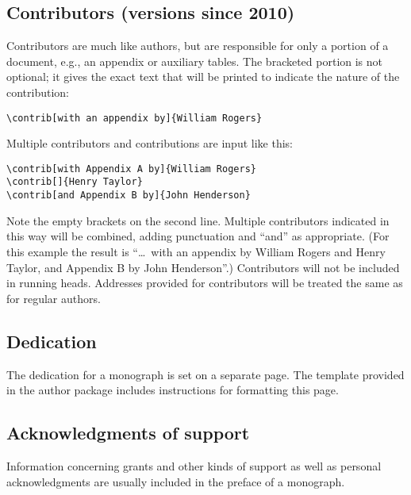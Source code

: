 \subsection{Contributors
  {\texorpdfstring{\protect\mdseries}{}(versions since 2010)}}
\label{ss:contrib}
Contributors are much like authors, but are responsible for only
a portion of a document, e.g., an appendix or auxiliary tables.
The bracketed portion is not optional; it gives the exact text that
will be printed to indicate the nature of the contribution:
\begin{verbatim}
\contrib[with an appendix by]{William Rogers}
\end{verbatim}
Multiple contributors and contributions are input like this:
\begin{verbatim}
\contrib[with Appendix A by]{William Rogers}
\contrib[]{Henry Taylor}
\contrib[and Appendix B by]{John Henderson}
\end{verbatim}
Note the empty brackets on the second line.  Multiple contributors
indicated in this way will be combined, adding punctuation and ``and''
as appropriate.  (For this example the result is ``\dots\ with an
appendix by William Rogers and Henry Taylor, and Appendix B by
John Henderson''.)
\ifmonograph
\else\ifmemoirs
\else
 Contributors will not be included in running heads.
\fi\fi
Addresses provided for contributors will be treated the same as for
regular authors.

\subsection{Dedication}
\ifmonograph
 The dedication for a monograph is set on a separate page.  The template
 provided in the author package includes instructions for formatting
 this page.
\fi

\subsection{Acknowledgments of support%
 }
\ifmonograph
 Information concerning grants and other kinds of support as well as
 personal acknowledgments are usually included in the preface of a monograph.
\fi


